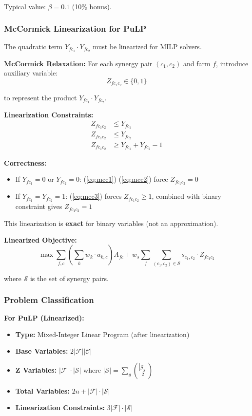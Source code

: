 \documentclass[11pt,a4paper]{article}
\begin{document}
Typical value: $\beta = 0.1$ (10\% bonus).

\subsubsection{McCormick Linearization for PuLP}

The quadratic term $Y_{fc_1} \cdot Y_{fc_2}$ must be linearized for MILP solvers.

\textbf{McCormick Relaxation:}
For each synergy pair $(c_1, c_2)$ and farm $f$, introduce auxiliary variable:
\begin{equation}
Z_{fc_1c_2} \in \{0,1\}
\end{equation}

to represent the product $Y_{fc_1} \cdot Y_{fc_2}$.

\textbf{Linearization Constraints:}
\begin{align}
Z_{fc_1c_2} &\leq Y_{fc_1} \label{eq:mcc1}\\
Z_{fc_1c_2} &\leq Y_{fc_2} \label{eq:mcc2}\\
Z_{fc_1c_2} &\geq Y_{fc_1} + Y_{fc_2} - 1 \label{eq:mcc3}
\end{align}

\textbf{Correctness:}
\begin{itemize}
    \item If $Y_{fc_1} = 0$ or $Y_{fc_2} = 0$: (\ref{eq:mcc1})-(\ref{eq:mcc2}) force $Z_{fc_1c_2} = 0$
    \item If $Y_{fc_1} = Y_{fc_2} = 1$: (\ref{eq:mcc3}) forces $Z_{fc_1c_2} \geq 1$, combined with binary constraint gives $Z_{fc_1c_2} = 1$
\end{itemize}

This linearization is \textbf{exact} for binary variables (not an approximation).

\textbf{Linearized Objective:}
\begin{equation}
\max \sum_{f,c} \left(\sum_k w_k \cdot a_{k,c}\right) A_{fc} + w_s \sum_f \sum_{(c_1,c_2) \in \mathcal{S}} s_{c_1,c_2} \cdot Z_{fc_1c_2}
\end{equation}

where $\mathcal{S}$ is the set of synergy pairs.

\subsubsection{Problem Classification}

\textbf{For PuLP (Linearized):}
\begin{itemize}
    \item \textbf{Type:} Mixed-Integer Linear Program (after linearization)
    \item \textbf{Base Variables:} $2|\mathcal{F}||\mathcal{C}|$
    \item \textbf{Z Variables:} $|\mathcal{F}| \cdot |\mathcal{S}|$ where $|\mathcal{S}| = \sum_g \binom{|\mathcal{G}_g|}{2}$
    \item \textbf{Total Variables:} $2n + |\mathcal{F}| \cdot |\mathcal{S}|$
    \item \textbf{Linearization Constraints:} $3|\mathcal{F}| \cdot |\mathcal{S}|$
\end{itemize}
\end{document}
